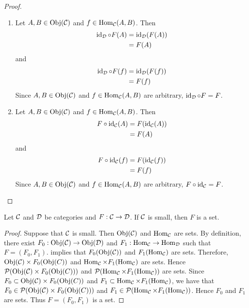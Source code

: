 \documentclass{book}
\begin{document}
	\begin{proof}\
		\begin{enumerate}
			\item Let $A, B \in \Obj(\MC)$ and $f \in \Hom_{\MC}(A, B)$. Then 
			\begin{align*}
				\id_{\MD} \circ F(A) 
				& = \id_{\MD}(F(A)) \\
				& = F(A)
			\end{align*}
			and 
			\begin{align*}
				\id_{\MD} \circ F(f) 
				& = \id_{\MD}(F(f)) \\
				& = F(f)
			\end{align*} 
			Since $A, B \in \Obj(\MC)$ and $f \in \Hom_{\MC}(A, B)$ are arbitrary, $\id_{\MD} \circ F = F$.
			\item Let $A, B \in \Obj(\MC)$ and $f \in \Hom_{\MC}(A, B)$. Then
			\begin{align*}
				F \circ \id_{\MC}(A) 
				& = F(\id_{\MC}(A)) \\
				& = F(A) 
			\end{align*}
			and 
			\begin{align*}
				F \circ \id_{\MC}(f) 
				& = F (\id_{\MC}(f)) \\
				& = F(f)
			\end{align*} 
			Since $A, B \in \Obj(\MC)$ and $f \in \Hom_{\MC}(A, B)$ are arbitrary, $ F \circ \id_{\MC} = F$.
		\end{enumerate}
	\end{proof}
	
	\begin{ex} 
		Let $\MC$ and $\MD$ be categories and $F:\MC \rightarrow \MD$. If $\MC$ is small, then $F$ is a set.
	\end{ex}
	
	\begin{proof}
		Suppose that $\MC$ is small. Then $\Obj(\MC)$ and $\Hom_{\MC}$ are sets. By definition, there exist $F_0: \Obj(\MC) \rightarrow \Obj(\MD)$ and $F_1: \Hom_{\MC} \rightarrow \Hom_{\MD}$ such that $F = (F_0, F_1)$.  implies that $F_0(\Obj(\MC))$ and $F_1(\Hom_{\MC})$ are sets. Therefore, $\Obj(\MC) \times F_0(\Obj(C))$ and $\Hom_{\MC} \times F_1(\Hom_{\MC})$ are sets. Hence $\MP(\Obj(\MC) \times F_0(\Obj(C)))$ and $\MP(\Hom_{\MC} \times F_1(\Hom_{\MC}))$ are sets. Since $F_0 \subset \Obj(\MC) \times F_0(\Obj(C))$ and $F_1 \subset \Hom_{\MC} \times F_1(\Hom_{\MC})$, we have that $F_0 \in \MP(\Obj(\MC) \times F_0(\Obj(C)))$ and $F_1 \in \MP(\Hom_{\MC} \times F_1(\Hom_{\MC}))$. Hence $F_0$ and $F_1$ are sets. Thus $F = (F_0, F_1)$ is a set. 
	\end{proof}
\end{document}

